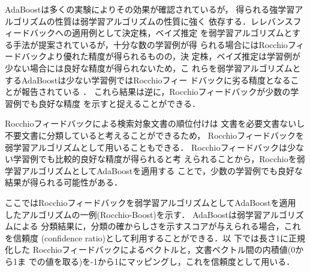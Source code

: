 AdaBoostは多くの実験によりその効果が確認されているが，
得られる強学習アルゴリズムの性質は弱学習アルゴリズムの性質に強く
依存する．レレバンスフィードバックへの適用例として決定株，ベイズ推定
を弱学習アルゴリズムとする手法が提案されているが，十分な数の学習例が得
られる場合にはRocchioフィードバックより優れた精度が得られるものの，決
定株，ベイズ推定は学習例が少ない場合には良好な精度が得られないため，こ
れらを弱学習アルゴリズムとするAdaBoostは少ない学習例ではRocchioフィー
ドバックに劣る精度となることが報告されている
\cite{bib:Boost_and_Rocchio,bib:Yu}．
これら結果は逆に，Rocchioフィードバックが少数の学習例でも良好な精度
を示すと捉えることができる．

Rocchioフィードバックによる検索対象文書の順位付けは
文書を必要文書ないし不要文書に分類していると考えることができるため，
Rocchioフィードバックを弱学習アルゴリズムとして用いることもできる．
Rocchioフィードバックは少ない学習例でも比較的良好な精度が得られると考
えられることから，Rocchioを弱学習アルゴリズムとしてAdaBoostを適用する
ことで，少数の学習例でも良好な結果が得られる可能性がある．

ここではRocchioフィードバックを弱学習アルゴリズムとしてAdaBoostを適用
したアルゴリズムの一例(Rocchio-Boost)を示す．
AdaBoostは弱学習アルゴリズムによる
分類結果に，分類の確からしさを示すスコアが与えられる場合，これを信頼度
(confidence ratio)として利用することができる\cite{bib:Boost_conf}．以
下では長さ1に正規化した
Rocchioフィードバックによるベクトルと，文書ベクトル間の内積値(0から1ま
での値を取る)を-1から1にマッピングし，これを信頼度として用いる．

